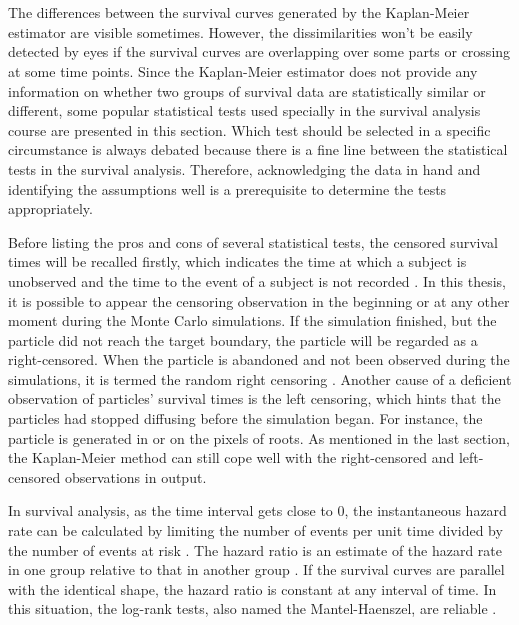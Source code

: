 \section{}\label{statistical tests}

The differences between the survival curves generated by the
Kaplan-Meier estimator are visible sometimes. However, the
dissimilarities won't be easily detected by eyes if the survival
curves are overlapping over some parts or crossing at some time
points.  Since the Kaplan-Meier estimator does not provide any
information on whether two groups of survival data are statistically
similar or different, some popular statistical tests used specially in
the survival analysis course are presented in this section. Which test
should be selected in a specific circumstance is always debated
because there is a fine line between the statistical tests in the
survival analysis. Therefore, acknowledging the data in hand and
identifying the assumptions well is a prerequisite to determine the
tests appropriately.

Before listing the pros and cons of several statistical tests, the
censored survival times will be recalled firstly, which indicates the
time at which a subject is unobserved and the time to the event of a
subject is not recorded \cite{etikan2018choosing}. In this thesis, it
is possible to appear the censoring observation in the beginning or at
any other moment during the Monte Carlo simulations. If the simulation
finished, but the particle did not reach the target boundary, the
particle will be regarded as a right-censored. When the particle is
abandoned and not been observed during the simulations, it is termed
the random right censoring \cite{etikan2018choosing}. Another cause of
a deficient observation of particles' survival times is the left
censoring, which hints that the particles had stopped diffusing before
the simulation began. For instance, the particle is generated in or on
the pixels of roots. As mentioned in the last section, the
Kaplan-Meier method can still cope well with the right-censored and
left-censored observations in output.


In survival analysis, as the time interval gets close to $0$, the
instantaneous hazard rate can be calculated by limiting the number of
events per unit time divided by the number of events at risk
\cite{case2002interpreting}. The hazard ratio is an estimate of the
hazard rate in one group relative to that in another group
\cite{singh2011survival}. If the survival curves are parallel with the
identical shape, the hazard ratio is constant at any interval of
time. In this situation, the log-rank tests, also named the
Mantel-Haenszel, are reliable \cite{custodio2007diagnostics}.

